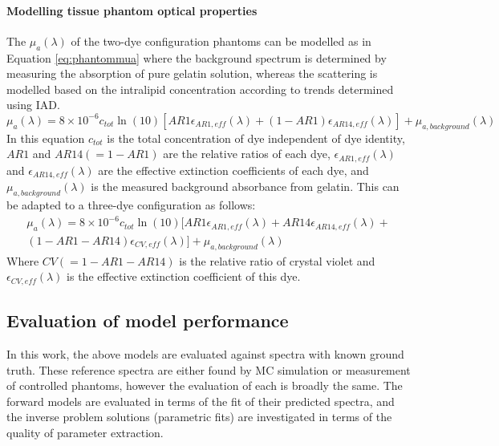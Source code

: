 \paragraph{Modelling tissue phantom optical properties}\label{sec:methodphantommodel}
The $\mu_a(\lambda)$ of the two-dye configuration phantoms can be modelled as in Equation \eqref{eq:phantommua} where the background spectrum is determined by measuring the absorption of pure gelatin solution, whereas the scattering is modelled based on the intralipid concentration according to trends determined using IAD. 
\begin{equation}
    \mu_{a}(\lambda) = 8\times10^{-6}c_{tot}\ln(10)[AR1 \epsilon_{AR1, eff}(\lambda) + 
    (1 - AR1)
    \epsilon_{AR14, eff}(\lambda)] + \mu_{a, background}(\lambda)
    \label{eq:phantommua} %
\end{equation}
In this equation $c_{tot}$ is the total concentration of dye independent of dye identity, $AR1$ and 
$AR14 (=1-AR1)$
are the relative ratios of each dye, $\epsilon_{AR1, eff}(\lambda)$ and $\epsilon_{AR14, eff}(\lambda)$ are the effective extinction coefficients of each dye, and  $\mu_{a, background}(\lambda)$ is the measured background absorbance from gelatin. This can be adapted to a three-dye configuration as follows: 
\begin{multline}
    \mu_{a}(\lambda) = 8\times10^{-6}c_{tot}\ln(10)[AR1 \epsilon_{AR1, eff}(\lambda) + AR14\epsilon_{AR14, eff}(\lambda) +\\
    (1 - AR1 - AR14)\epsilon_{CV, eff}(\lambda)] + \mu_{a, background}(\lambda)
    \label{eq:phantommua3}
\end{multline}
Where 
$CV (=1-AR1-AR14) $
is the relative ratio of crystal violet and $\epsilon_{CV, eff}(\lambda)$ is the effective extinction coefficient of this dye.

\subsection{Evaluation of model performance}\label{sec:methodevaluate}
In this work, the above models are evaluated against spectra with known ground truth. These reference spectra are either found by MC simulation or measurement of controlled phantoms, however the evaluation of each is broadly the same. The forward models are evaluated in terms of the fit of their predicted spectra, and the inverse problem solutions (parametric fits) are investigated in terms of the quality of parameter extraction. 


